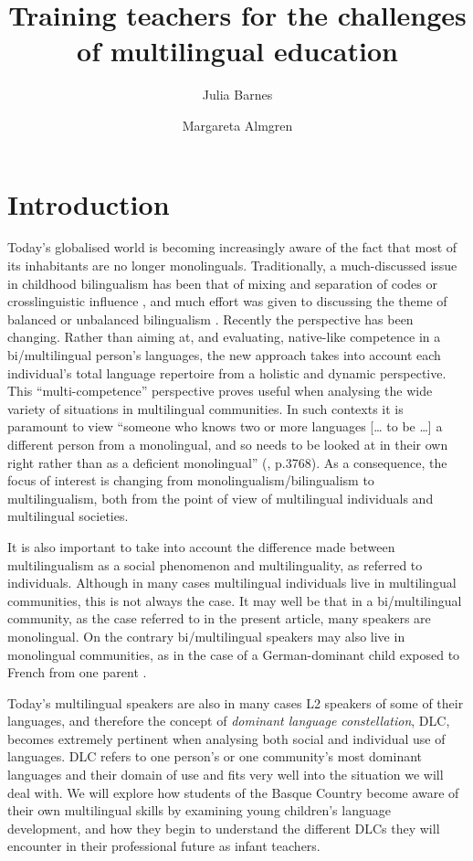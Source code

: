 \documentclass[output=paper]{../langscibook}
\author{Julia Barnes\affiliation{University of the Basque Country}\orcid{}\and Margareta Almgren\affiliation{ University of the Basque Country}}
\title{Training teachers for the challenges of multilingual education}
\begin{document}
\maketitle 



 \section{Introduction}


Today’s globalised world is becoming increasingly aware of the fact that most of its inhabitants are no longer monolinguals. Traditionally, a much-discussed issue in childhood bilingualism has been that of mixing and separation of codes \citep{Meisel2001} or crosslinguistic influence \citep{Lanza1998,MullerHulk2001}, and much effort was given to discussing the theme of balanced or unbalanced bilingualism \citep{DeHouwer2009}. Recently the perspective has been changing. Rather than aiming at, and evaluating, native-like competence in a bi/multilingual person’s languages, the new approach takes into account each individual’s total language repertoire from a holistic and dynamic perspective. This “multi-competence” perspective \citep{Aronin2016} proves useful when analysing the wide variety of situations in multilingual communities. In such contexts it is paramount to view “someone who knows two or more languages  [… to be …] a different person from a monolingual, and so needs to be looked at in their own right rather than as a deficient monolingual” (\citealt{Cook2013}, p.3768). As a consequence, the focus of interest is changing from monolingualism/bilingualism to multilingualism, both from the point of view of multilingual individuals and multilingual societies. 

It is also important to take into account the difference made between multilingualism as a social phenomenon and multilinguality, as referred to individuals. Although in many cases multilingual individuals live in multilingual communities, this is not always the case. It may well be that in a bi/multilingual community, as the case referred to in the present article, many speakers are monolingual. On the contrary bi/multilingual speakers may also live in monolingual communities, as in the case of a German-dominant child exposed to French from one parent \citep{Meisel2008}.

Today’s multilingual speakers are also in many cases L2 speakers of some of their languages, and therefore the concept of \emph{dominant language constellation}, DLC, \citep{Aronin2016} becomes extremely pertinent when analysing both social and individual use of languages. DLC refers to one person’s or one community’s most dominant languages and their domain of use and fits very well into the situation we will deal with. We will explore how students of the Basque Country become aware of their own multilingual skills by examining young children’s language development, and how they begin to understand the different DLCs they will encounter in their professional future as infant teachers.
\end{document}
